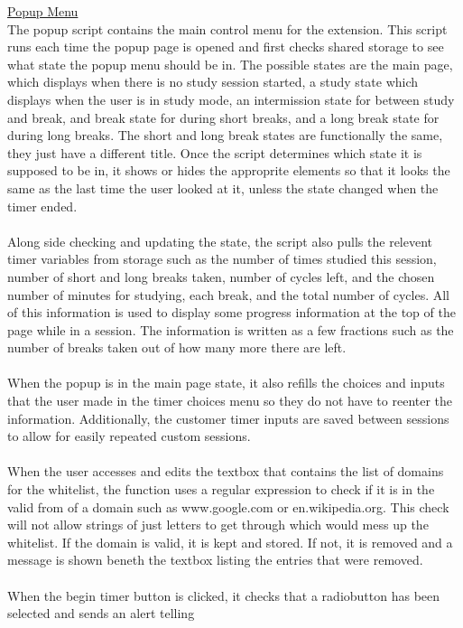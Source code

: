 \documentclass[12pt]{article}
\begin{document}
\noindent \underline{Popup Menu} \\
The popup script contains the main control menu for the extension. This script runs each time the popup page 
is opened and first checks shared storage to see what state the popup menu should be in. The possible states 
are the main page, which displays when there is no study session started, a study state which displays when 
the user is in study mode, an intermission state for between study and break, and break state for during short breaks, 
and a long break state for during long breaks. The short and long break states are functionally the same, they just 
have a different title. Once the script determines which state it is supposed to be in, it shows or hides the 
approprite elements so that it looks the same as the last time the user looked at it, unless the state changed when the timer ended. 
\\\\Along side checking and updating the state, the script also pulls the relevent timer variables from storage such as 
the number of times studied this session, number of short and long breaks taken, number of cycles left, and the chosen number of minutes 
for studying, each break, and the total number of cycles. All of this information is used to display some progress information at the top of 
the page while in a session. The information is written as a few fractions such as the number of breaks taken out of how many more there are left. 
\\\\When the popup is in the main page state, it also refills the choices and inputs that the user made 
in the timer choices menu so they do not have to reenter the information. Additionally, the customer timer inputs are saved between sessions to 
allow for easily repeated custom sessions. 
\\\\When the user accesses and edits the textbox that contains the list of domains for the whitelist, 
the function uses a regular expression to check if it is in the valid from of a domain such as www.google.com or en.wikipedia.org. 
This check will not allow strings of just letters to get through which would mess up the whitelist. If the domain is valid, it is kept and stored. 
If not, it is removed and a message is shown beneth the textbox listing the entries that were removed. 
\\\\When the begin timer button is clicked, it checks that a radiobutton has been selected and sends an alert telling 
\end{document}
